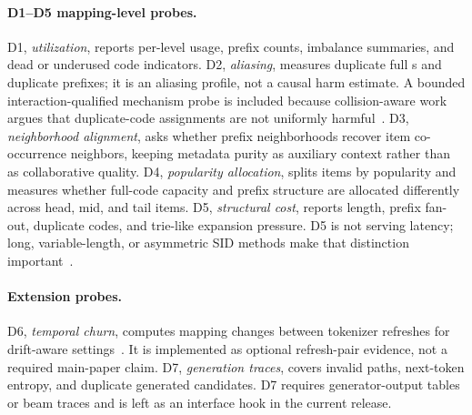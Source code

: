 \paragraph{D1--D5 mapping-level probes.}
D1, \emph{utilization}, reports per-level usage, prefix counts, imbalance
summaries, and dead or underused code indicators. D2, \emph{aliasing},
measures duplicate full \sid{}s and duplicate prefixes; it is an aliasing
profile, not a causal harm estimate. A bounded interaction-qualified mechanism
probe is included because collision-aware work argues that duplicate-code
assignments are not uniformly harmful~\cite{hu2026quasid}. D3, \emph{neighborhood alignment}, asks
whether prefix neighborhoods recover item co-occurrence neighbors, keeping
metadata purity as auxiliary context rather than as collaborative quality. D4,
\emph{popularity allocation}, splits items by popularity and measures whether
full-code capacity and prefix structure are allocated differently across head,
mid, and tail items. D5, \emph{structural cost}, reports \sid length, prefix
fan-out, duplicate codes, and trie-like expansion pressure. D5 is not serving
latency; long, variable-length, or asymmetric SID methods make that distinction
important~\cite{xia2026acerec,cheng2026capsid,huang2026asymrec,zhang2026hgrec,wang2026varlenrec}.

\paragraph{Extension probes.}
D6, \emph{temporal churn}, computes mapping changes between tokenizer
refreshes for drift-aware settings~\cite{feng2026dact,baikalov2026staleness}.
It is implemented as optional refresh-pair evidence, not a required main-paper
claim.
D7, \emph{generation traces}, covers invalid paths, next-token entropy, and
duplicate generated candidates. D7 requires generator-output tables or beam
traces and is left as an interface hook in the current release.
